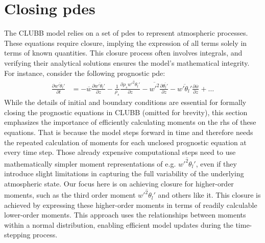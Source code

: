 \section{Closing pdes}\label{sec:closing_pdes}

The \gls{CLUBB} model relies on a set of \glspl{pde} to represent atmospheric processes.
These equations require closure,
implying the expression of all terms solely in terms of known quantities.
This closure process often involves integrals,
and verifying their analytical solutions ensures the model's mathematical integrity.
For instance, consider the following prognostic {\gls{pde}\autocite[p. 21]{larson2022clubbsilhs}}:
\begin{align*}
    \frac{\partial \overline{w'\theta_l'}}{\partial t}
    &= -\overline{w}\frac{\partial \overline{w'\theta_l'}}{\partial z}
    - \frac{1}{\rho_s} \frac{\partial \rho_s \overline{w'^2 \theta_l'}}{\partial z}
    - \overline{w'^2} \frac{\partial \overline{\theta_l'}}{\partial z}
    - \overline{w'\theta_l'} \frac{\partial \overline{w}}{\partial z}
    + \ldots
\end{align*}
While the details of initial and boundary conditions are essential
for formally closing the prognostic equations in \gls{CLUBB} (omitted for brevity),
this section emphasizes the importance of efficiently calculating moments
on the \gls{rhs} of these equations.
That is because the model steps forward in time
and therefore needs the repeated calculation of moments
for each unclosed prognostic equation at every time step.
Those already expensive computational steps need to use mathematically simpler moment representations
of e.g. $\overline{w'^2 \theta_l'}$,
even if they introduce slight limitations
in capturing the full variability of the underlying atmospheric state.
Our focus here is on achieving closure for higher-order moments,
such as the third order moment $\overline{w'^2 \theta_l'}$ and others like it.
This closure is achieved by expressing these higher-order moments
in terms of readily calculable lower-order moments.
This approach uses the relationships between moments within a normal distribution,
enabling efficient model updates during the time-stepping process.
